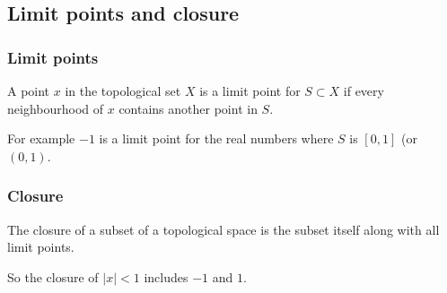 
\subsection{Limit points and closure}

\subsubsection{Limit points}

A point \(x\) in the topological set \(X\) is a limit point for \(S\subset X\) if every neighbourhood of \(x\) contains another point in \(S\).

For example \(-1\) is a limit point for the real numbers where \(S\) is \([0,1]\) (or \((0,1)\).

\subsubsection{Closure}

The closure of a subset of a topological space is the subset itself along with all limit points.

So the closure of \(|x|<1\) includes \(-1\) and \(1\).

